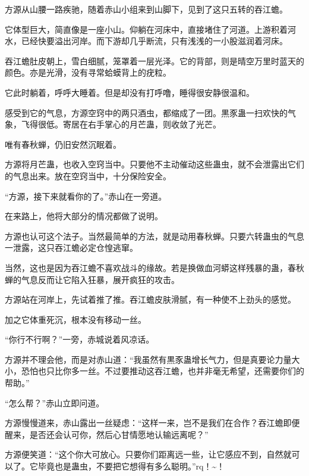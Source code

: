 \begin{this_body}
方源从山腰一路疾驰，随着赤山小组来到山脚下，见到了这只五转的吞江蟾。

它体型巨大，简直像是一座小山。仰躺在河床中，直接堵住了河道。上游积着河水，已经快要溢出河岸。而下游却几乎断流，只有浅浅的一小股滋润着河床。

吞江蟾肚皮朝上，雪白细腻，笼罩着一层光泽。它的背部，则是晴空万里时蓝天的颜色。亦是光滑，没有寻常蛤蟆背上的疣粒。

它此时躺着，呼呼大睡着。但是却没有打呼噜，睡得很安静很温和。

感受到它的气息，方源空窍中的两只酒虫，都缩成了一团。黒豕蛊一扫欢快的气象，飞得很低。寄居在右手掌心的月芒蛊，则收敛了光芒。

唯有春秋蝉，仍旧安然沉眠着。

方源将月芒蛊，也收入空窍当中。只要他不主动催动这些蛊虫，就不会泄露出它们的气息出来。放在空窍当中，十分保险安全。

“方源，接下来就看你的了。”赤山在一旁道。

在来路上，他将大部分的情况都做了说明。

方源也认可这个法子。当然最简单的方法，就是动用春秋蝉。只要六转蛊虫的气息一泄露，这只吞江蟾必定仓惶逃窜。

当然，这也是因为吞江蟾不喜欢战斗的缘故。若是换做血河蟒这样残暴的蛊，春秋蝉的气息反而让它陷入狂暴，展开疯狂的攻击。

方源站在河岸上，先试着推了推。吞江蟾皮肤滑腻，有一种使不上劲头的感觉。

加之它体重死沉，根本没有移动一丝。

“你行不行啊？”一旁，赤城说着风凉话。

方源并不理会他，而是对赤山道：“我虽然有黒豕蛊增长气力，但是真要论力量大小，恐怕也只比你多一丝。不过要推动这吞江蟾，也并非毫无希望，还需要你们的帮助。”

“怎么帮？”赤山立即问道。

方源慢慢道来，赤山露出一丝疑虑：“这样一来，岂不是我们在合作？吞江蟾即便醒来，是否还会认可你，然后心甘情愿地认输远离呢？”

方源便笑道：“这个你大可放心。只要你们距离远一些，让它感应不到，自然就可以了。它毕竟也是蛊虫，不要把它想得有多么聪明。”rq！\~{}！

\end{this_body}

